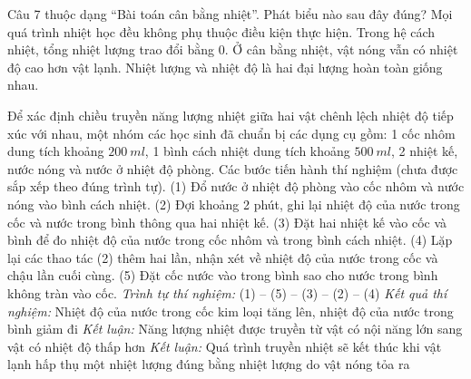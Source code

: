 \begin{ex}
Câu 7 thuộc dạng “Bài toán cân bằng nhiệt”. Phát biểu nào sau đây đúng?
\choice
{Mọi quá trình nhiệt học đều không phụ thuộc điều kiện thực hiện.}
{\True Trong hệ cách nhiệt, tổng nhiệt lượng trao đổi bằng 0.}
{Ở cân bằng nhiệt, vật nóng vẫn có nhiệt độ cao hơn vật lạnh.}
{Nhiệt lượng và nhiệt độ là hai đại lượng hoàn toàn giống nhau.}
\end{ex}

\begin{ex}
Để xác định chiều truyền năng lượng nhiệt giữa hai vật chênh lệch nhiệt độ tiếp xúc với nhau, một nhóm các học sinh đã chuẩn bị các dụng cụ gồm: 1 cốc nhôm dung tích khoảng $200\ ml$, 1 bình cách nhiệt dung tích khoảng $500\ ml$, 2 nhiệt kế, nước nóng và nước ở nhiệt độ phòng.
Các bước tiến hành thí nghiệm (chưa được sắp xếp theo đúng trình tự).
	(1) Đổ nước ở nhiệt độ phòng vào cốc nhôm và nước nóng vào bình cách nhiệt.
(2) Đợi khoảng 2 phút, ghi lại nhiệt độ của nước trong cốc và nước trong bình thông qua hai nhiệt kế.
(3) Đặt hai nhiệt kế vào cốc và bình để đo nhiệt độ của nước trong cốc nhôm và trong bình cách nhiệt.
(4) Lặp lại các thao tác (2) thêm hai lần, nhận xét về nhiệt độ của nước trong cốc và chậu lần cuối cùng.
(5) Đặt cốc nước vào trong bình sao cho nước trong bình không tràn vào cốc.
\choiceTF
{\True \textit{Trình tự thí nghiệm:} (1) – (5) – (3) – (2) – (4)}
{\True \textit{Kết quả thí nghiệm:} Nhiệt độ của nước trong cốc kim loại tăng lên, nhiệt độ của nước trong bình giảm đi}
{\textit{Kết luận:} Năng lượng nhiệt được truyền từ vật có nội năng lớn sang vật có nhiệt độ thấp hơn}
{\True \textit{Kết luận:} Quá trình truyền nhiệt sẽ kết thúc khi vật lạnh hấp thụ một nhiệt lượng đúng bằng nhiệt lượng do vật nóng tỏa ra}
\end{ex}

